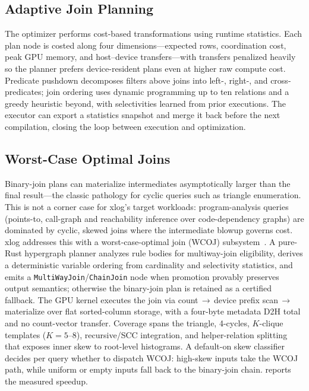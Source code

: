 \subsection{Adaptive Join Planning}

The optimizer performs cost-based transformations using runtime statistics. Each plan node is costed along four dimensions---expected rows, coordination cost, peak GPU memory, and host--device transfers---with transfers penalized heavily so the planner prefers device-resident plans even at higher raw compute cost. Predicate pushdown decomposes filters above joins into left-, right-, and cross-predicates; join ordering uses dynamic programming up to ten relations and a greedy heuristic beyond, with selectivities learned from prior executions. The executor can export a statistics snapshot and merge it back before the next compilation, closing the loop between execution and optimization.

\subsection{Worst-Case Optimal Joins}

Binary-join plans can materialize intermediates asymptotically larger than the final result---the classic pathology for cyclic queries such as triangle enumeration. This is not a corner case for xlog's target workloads: program-analysis queries (points-to, call-graph and reachability inference over code-dependency graphs) are dominated by cyclic, skewed joins where the intermediate blowup governs cost. xlog addresses this with a worst-case-optimal join (WCOJ) subsystem~\cite{ngo2018wcoj,veldhuizen2014leapfrog,wang2023freejoin}. A pure-Rust hypergraph planner analyzes rule bodies for multiway-join eligibility, derives a deterministic variable ordering from cardinality and selectivity statistics, and emits a \texttt{MultiWayJoin}/\texttt{ChainJoin} node when promotion provably preserves output semantics; otherwise the binary-join plan is retained as a certified fallback. The GPU kernel executes the join via count\,$\to$\,device prefix scan\,$\to$\,materialize over flat sorted-column storage, with a four-byte metadata D2H total and no count-vector transfer. Coverage spans the triangle, 4-cycles, $K$-clique templates ($K{=}5$--$8$), recursive/SCC integration, and helper-relation splitting that exposes inner skew to root-level histograms. A default-on skew classifier decides per query whether to dispatch WCOJ: high-skew inputs take the WCOJ path, while uniform or empty inputs fall back to the binary-join chain.  reports the measured speedup.


